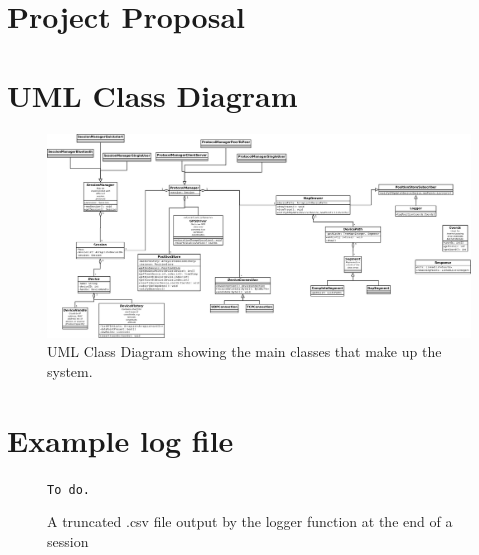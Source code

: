 %
\cleardoublepage

\appendix

\chapter{Project Proposal}

%

\chapter{UML Class Diagram}

\begin{figure}
\centering
\includegraphics[angle = 90, scale=0.17]{UMLClassDiagram}
\caption{UML Class Diagram showing the main classes that make up the system.}
\label{fig:uml}
\end{figure}

\chapter{Example log file}

\begin{figure}
{\tt To do.}
\caption{A truncated .csv file output by the logger function at the end of a session}
\label{csv}
\end{figure}


